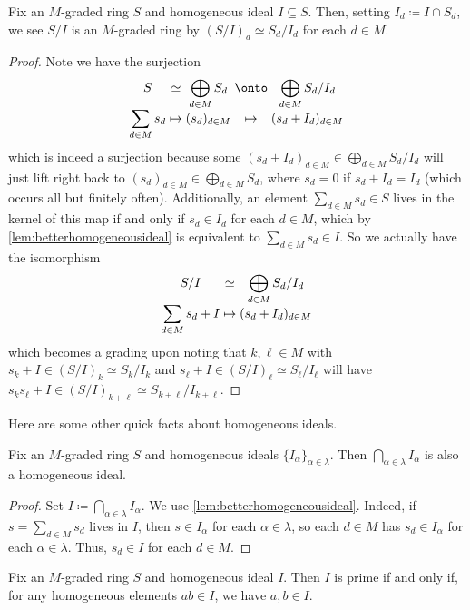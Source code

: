 \documentclass[../notes.tex]{subfiles}
\begin{document}
\begin{corollary}
	Fix an $M$-graded ring $S$ and homogeneous ideal $I\subseteq S$. Then, setting $I_d\coloneqq I\cap S_d$, we see $S/I$ is an $M$-graded ring by $(S/I)_d\simeq S_d/I_d$ for each $d\in M$.
\end{corollary}
\begin{proof}
	Note we have the surjection
	\[\arraycolsep=1.4pt\begin{array}{ccccc}
		S &\simeq& \displaystyle\bigoplus_{d\in M}S_d &\onto& \displaystyle\bigoplus_{d\in M}S_d/I_d \\
		\displaystyle\sum_{d\in M}s_d &\mapsto& (s_d)_{d\in M} &\mapsto& (s_d+I_d)_{d\in M}
	\end{array}\]
	which is indeed a surjection because some $(s_d+I_d)_{d\in M}\in\bigoplus_{d\in M}S_d/I_d$ will just lift right back to $(s_d)_{d\in M}\in\bigoplus_{d\in M}S_d$, where $s_d=0$ if $s_d+I_d=I_d$ (which occurs all but finitely often). Additionally, an element $\sum_{d\in M}s_d\in S$ lives in the kernel of this map if and only if $s_d\in I_d$ for each $d\in M$, which by \autoref{lem:betterhomogeneousideal} is equivalent to $\sum_{d\in M}s_d\in I$. So we actually have the isomorphism
	\[\arraycolsep=1.4pt\begin{array}{ccccc}
		S/I &\simeq& \displaystyle\bigoplus_{d\in M}S_d/I_d \\
		\displaystyle\sum_{d\in M}s_d+I &\mapsto& (s_d+I_d)_{d\in M}
	\end{array}\]
	which becomes a grading upon noting that $k,\ell\in M$ with $s_k+I\in(S/I)_k\simeq S_k/I_k$ and $s_\ell+I\in(S/I)_\ell\simeq S_\ell/I_\ell$ will have $s_ks_\ell+I\in(S/I)_{k+\ell}\simeq S_{k+\ell}/I_{k+\ell}$.
\end{proof}
Here are some other quick facts about homogeneous ideals.
\begin{corollary} \label{cor:intersecthomoideals}
	Fix an $M$-graded ring $S$ and homogeneous ideals $\{I_\alpha\}_{\alpha\in\lambda}$. Then $\bigcap_{\alpha\in\lambda}I_\alpha$ is also a homogeneous ideal.
\end{corollary}
\begin{proof}
	Set $I\coloneqq\bigcap_{\alpha\in\lambda}I_\alpha$. We use \autoref{lem:betterhomogeneousideal}. Indeed, if $s=\sum_{d\in M}s_d$ lives in $I$, then $s\in I_\alpha$ for each $\alpha\in\lambda$, so each $d\in M$ has $s_d\in I_\alpha$ for each $\alpha\in\lambda$. Thus, $s_d\in I$ for each $d\in M$.
\end{proof}
\begin{lemma} \label{lem:fasthomoprime}
	Fix an $M$-graded ring $S$ and homogeneous ideal $I$. Then $I$ is prime if and only if, for any homogeneous elements $ab\in I$, we have $a,b\in I$.
\end{lemma}
\end{document}
